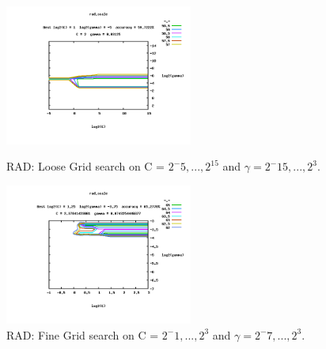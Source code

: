 \documentclass[11pt,nocopyrightspace]{config}
\begin{document}
\begin{figure}[h]
	\centering
	\includegraphics[width=0.55\textwidth]{coarseGridRad}
	\caption{RAD: Loose Grid search on C = $2^-5,...,2^15$ and $\gamma=2^-15,...,2^3$.}
	\label{fig:looseRad}
	\includegraphics[width=0.55\textwidth]{fineGridRad}
	\caption{RAD: Fine Grid search on C = $2^-1,...,2^3$ and $\gamma=2^-7,...,2^3$.}
	\label{fig:fineRad}
\end{figure}
\end{document}
